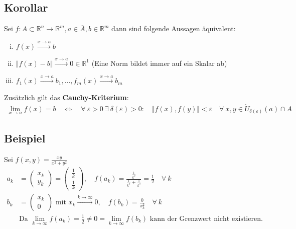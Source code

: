 \documentclass[11pt,a4paper]{book}
\newcommand {\R}	{\mathbb{R}}
\newcommand {\Rn}	{\mathbb{R}^n}
\newcommand {\Rm}	{\mathbb{R}^m}
\newcommand{\1}    	{\mathbbm{1}}
\newcommand{\mitt}	{\textrm{ mit }}
\begin{document}
\subsection{Korollar}
Sei \(f : A \subset \Rn \rightarrow \Rm, a \in \overline{A}, b \in \Rm\) dann sind folgende Aussagen äquivalent:
\begin{enumerate}[(i)]
	\item \( f(x) \stackrel{x \rightarrow a}{\rightarrow} b \)
	\item \( \Vert f(x) - b \Vert \stackrel{x \rightarrow a}{\rightarrow} 0 \in \R^1 \) (Eine Norm bildet immer auf ein Skalar ab)
	\item \( f_1(x) \stackrel{x \rightarrow a}{\rightarrow} b_1, ..., f_m(x) \stackrel{x \rightarrow a}{\rightarrow} b_m \)
\end{enumerate}
Zusätzlich gilt das \textbf{Cauchy-Kriterium}:
\begin{align*}
	\lim_{x \rightarrow a} f(x) = b \quad \Leftrightarrow \quad \forall~ \varepsilon > 0 ~ \exists~ \delta(\varepsilon) > 0: \quad 
	\Vert f(x), f(y) \Vert < \varepsilon \quad \forall~ x,y \in \dot{U}_{\delta(\varepsilon)}(a) \cap A
\end{align*}

\subsection{Beispiel}
Sei \( f(x,y) = \frac{xy}{x^2 + y^2} \)
\begin{align*}
	a_k &= \left( \begin{array}{c} x_k \\ y_k \end{array} \right) = \left( \begin{array}{c} \frac{1}{k} \\ \frac{1}{k} \end{array} \right), \quad 
	f(a_k) = \frac{\frac{1}{k^2}}{\frac{1}{k^2} + \frac{1}{k^2}} = \frac{1}{2} \quad \forall~ k \\
	b_k &= \left( \begin{array}{c} x_k \\ 0 \end{array} \right) \mitt x_k \stackrel{k \rightarrow \infty}{\rightarrow} 0, \quad
	f(b_k) = \frac{0}{x_k^2} \quad \forall~ k \\
	&\textrm{Da } \lim_{k \rightarrow \infty} f(a_k) = \frac{1}{2} \neq 0 = \lim_{k \rightarrow \infty} f(b_k) \textrm{ kann der Grenzwert nicht existieren.}
\end{align*}
\end{document}
